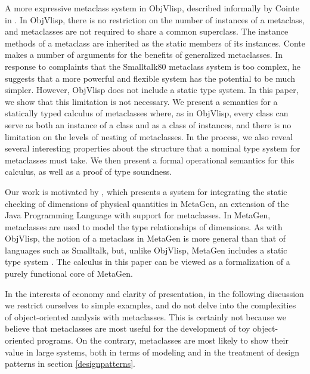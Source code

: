 \documentclass{acm-sigplan}
\begin{document}
A more expressive metaclass system in ObjVlisp, described informally
by Cointe in \cite{objvlisp}.  In ObjVlisp, there is no restriction on
the number of instances of a metaclass, and metaclasses are not
required to share a common superclass. The instance methods of a
metaclass are inherited as the static members of its instances.  Conte
makes a number of arguments for the benefits of generalized
metaclasses.  In response to complaints that the Smalltalk80 metaclass
system is too complex, he suggests that a more powerful and flexible
system has the potential to be much simpler.
However, ObjVlisp does not include a static type system. 
In this paper, we show that this limitation is not necessary. We
present a semantics for a statically typed calculus of metaclasses
where, as in ObjVlisp, every class can serve as both an instance of a
class and as a class of instances, and there is no limitation on the
levels of nesting of metaclasses. In the process, we also reveal
several interesting properties about the structure that a nominal type
system for metaclasses must take. We then present a formal operational
semantics for this calculus, as well as a proof of type soundness.

Our work is motivated by \cite{DimUnits}, which presents a system for
integrating the static checking of dimensions of physical quantities
in MetaGen, an extension of the Java Programming Language with support
for metaclasses. In MetaGen, metaclasses are used to model the type
relationships of dimensions.  As with ObjVlisp, the notion of a
metaclass in MetaGen is more general than that of languages such as
Smalltalk, but, unlike ObjVlisp, MetaGen includes a static type system
\cite{DimUnits}. The calculus in this paper can be viewed as a
formalization of a purely functional core of MetaGen.

In the interests of economy and clarity of presentation, in the
following discussion we restrict ourselves to simple examples, and do
not delve into the complexities of object-oriented analysis with metaclasses.  
This is certainly not because we believe that
metaclasses are most useful for the development of toy object-oriented
programs.  On the contrary, metaclasses are most likely to show their value
in large systems, both in terms of modeling and in the treatment of
design patterns in section \ref{designpatterns}.
\end{document}
